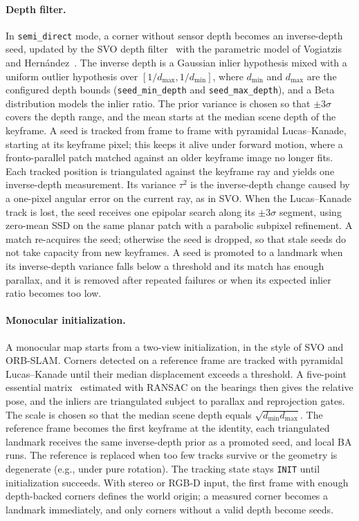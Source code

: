 \documentclass{article}
\let\oldparagraph\paragraph
\renewcommand{\paragraph}[1]{\oldparagraph{#1}\mbox{}}
\begin{document}
\paragraph{Depth filter.} In \texttt{semi\_direct} mode, a corner without sensor depth becomes an inverse-depth seed, updated by the SVO depth filter~\cite{forster2014svo} with the parametric model of Vogiatzis and Hern\'andez~\cite{vogiatzis2011video}. The inverse depth is a Gaussian inlier hypothesis mixed with a uniform outlier hypothesis over $[1/d_{\max}, 1/d_{\min}]$, where $d_{\min}$ and $d_{\max}$ are the configured depth bounds (\texttt{seed\_min\_depth} and \texttt{seed\_max\_depth}), and a Beta distribution models the inlier ratio. The prior variance is chosen so that $\pm 3\sigma$ covers the depth range, and the mean starts at the median scene depth of the keyframe. A seed is tracked from frame to frame with pyramidal Lucas--Kanade, starting at its keyframe pixel; this keeps it alive under forward motion, where a fronto-parallel patch matched against an older keyframe image no longer fits. Each tracked position is triangulated against the keyframe ray and yields one inverse-depth measurement. Its variance $\tau^2$ is the inverse-depth change caused by a one-pixel angular error on the current ray, as in SVO. When the Lucas--Kanade track is lost, the seed receives one epipolar search along its $\pm 3\sigma$ segment, using zero-mean SSD on the same planar patch with a parabolic subpixel refinement. A match re-acquires the seed; otherwise the seed is dropped, so that stale seeds do not take capacity from new keyframes. A seed is promoted to a landmark when its inverse-depth variance falls below a threshold and its match has enough parallax, and it is removed after repeated failures or when its expected inlier ratio becomes too low.

\paragraph{Monocular initialization.} A monocular map starts from a two-view initialization, in the style of SVO and ORB-SLAM. Corners detected on a reference frame are tracked with pyramidal Lucas--Kanade until their median displacement exceeds a threshold. A five-point essential matrix~\cite{nister2004efficient} estimated with RANSAC on the bearings then gives the relative pose, and the inliers are triangulated subject to parallax and reprojection gates. The scale is chosen so that the median scene depth equals $\sqrt{d_{\min} d_{\max}}$. The reference frame becomes the first keyframe at the identity, each triangulated landmark receives the same inverse-depth prior as a promoted seed, and local BA runs. The reference is replaced when too few tracks survive or the geometry is degenerate (e.g., under pure rotation). The tracking state stays \texttt{INIT} until initialization succeeds. With stereo or RGB-D input, the first frame with enough depth-backed corners defines the world origin; a measured corner becomes a landmark immediately, and only corners without a valid depth become seeds.
\end{document}
